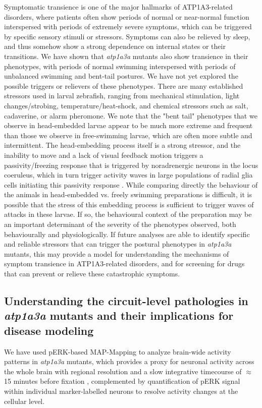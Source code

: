 \documentclass[9.5pt,lineno]{RandlettLab_elife}
\begin{document}
Symptomatic transience is one of the major hallmarks of ATP1A3-related disorders, where patients often show periods of normal or near-normal function interspersed with periods of extremely severe symptoms, which can be triggered by specific sensory stimuli or stressors. 
Symptoms can also be relieved by sleep, and thus somehow show a strong dependence on internal states or their transitions. 
We have shown that \emph{atp1a3a} mutants also show transience in their phenotypes, with periods of normal swimming interspersed with periods of unbalanced swimming and bent-tail postures. 
We have not yet explored the possible triggers or relievers of these phenotypes. 
There are many established stressors used in larval zebrafish, ranging from mechanical stimulation, light changes/strobing, temperature/heat-shock, and chemical stressors such as salt, cadaverine, or alarm pheromone. 
We note that the "bent tail" phenotypes that we observe in head-embedded larvae appear to be much more extreme and frequent than those we observe in free-swimming larvae, which are often more subtle and intermittent. 
The head-embedding process itself is a strong stressor, and the inability to move and a lack of visual feedback motion triggers a passivity/freezing response that is triggered by noradrenergic neurons in the  locus coeruleus, which in turn trigger activity waves in large populations of radial glia cells initiating this passivity response \citep{Mu2019}.
While comparing directly the behaviour of the animals in head-embedded vs. freely swimming preparations is difficult, it is possible that the stress of this embedding process is sufficient to trigger waves of attacks in these larvae. 
If so, the behavioural context of the preparation may be an important determinant of the severity of the phenotypes observed, both behaviourally and physiologically.
If future analyses are able to identify specific and reliable stressors that can trigger the postural phenotypes in \emph{atp1a3a} mutants, this may provide a model for understanding the mechanisms of symptom transience in ATP1A3-related disorders, and for screening for drugs that can prevent or relieve these catastrophic symptoms.

\subsection{Understanding the circuit-level pathologies in \emph{atp1a3a} mutants and their implications for disease modeling}

We have used pERK-based MAP-Mapping to analyze brain-wide activity patterns in \emph{atp1a3a} mutants, which provides a proxy for neuronal activity across the whole brain with regional resolution and a slow integrative timecourse of $\approx$15 minutes before fixation \citep{Randlett2015}, complemented by quantification of pERK signal within individual marker-labelled neurons to resolve activity changes at the cellular level.
\end{document}
